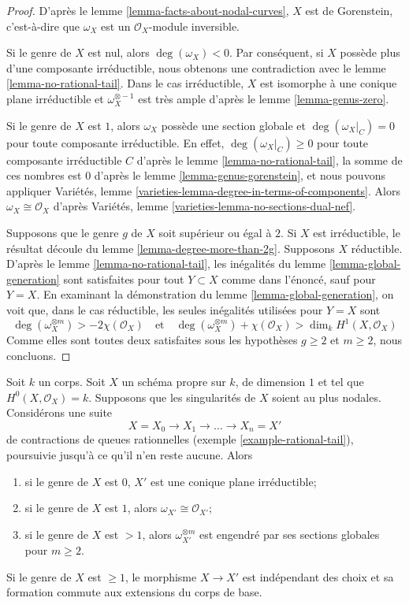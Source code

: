 \begin{proof}
D'après le lemme \ref{lemma-facts-about-nodal-curves}, $X$ est de Gorenstein, c'est-à-dire que $\omega_X$ est un $\mathcal{O}_X$-module inversible.

\medskip\noindent
Si le genre de $X$ est nul, alors $\deg(\omega_X) < 0$. Par conséquent, si $X$ possède plus d'une composante irréductible, nous obtenons une contradiction avec le lemme \ref{lemma-no-rational-tail}. Dans le cas irréductible, $X$ est isomorphe à une conique plane irréductible et $\omega_X^{\otimes -1}$ est très ample d'après le lemme \ref{lemma-genus-zero}.

\medskip\noindent
Si le genre de $X$ est $1$, alors $\omega_X$ possède une section globale et $\deg(\omega_X|_C) = 0$ pour toute composante irréductible. En effet, $\deg(\omega_X|_C) \geq 0$ pour toute composante irréductible $C$ d'après le lemme \ref{lemma-no-rational-tail}, la somme de ces nombres est $0$ d'après le lemme \ref{lemma-genus-gorenstein}, et nous pouvons appliquer Variétés, lemme \ref{varieties-lemma-degree-in-terms-of-components}. Alors $\omega_X \cong \mathcal{O}_X$ d'après Variétés, lemme \ref{varieties-lemma-no-sections-dual-nef}.

\medskip\noindent
Supposons que le genre $g$ de $X$ soit supérieur ou égal à $2$. Si $X$ est irréductible, le résultat découle du lemme \ref{lemma-degree-more-than-2g}. Supposons $X$ réductible. D'après le lemme \ref{lemma-no-rational-tail}, les inégalités du lemme \ref{lemma-global-generation} sont satisfaites pour tout $Y \subset X$ comme dans l'énoncé, sauf pour $Y = X$. En examinant la démonstration du lemme \ref{lemma-global-generation}, on voit que, dans le cas réductible, les seules inégalités utilisées pour $Y = X$ sont $$
\deg(\omega_X^{\otimes m}) > -2 \chi(\mathcal{O}_X)
\quad\text{et}\quad
\deg(\omega_X^{\otimes m}) + \chi(\mathcal{O}_X) > \dim_k H^1(X, \mathcal{O}_X)
$$ Comme elles sont toutes deux satisfaites sous les hypothèses $g \geq 2$ et $m \geq 2$, nous concluons.
\end{proof}

\begin{lemma}
\label{lemma-contracting-rational-tails}
Soit $k$ un corps. Soit $X$ un schéma propre sur $k$, de dimension $1$ et tel que $H^0(X, \mathcal{O}_X) = k$. Supposons que les singularités de $X$ soient au plus nodales. Considérons une suite $$
X = X_0 \to X_1 \to \ldots \to X_n = X'
$$ de contractions de queues rationnelles (exemple \ref{example-rational-tail}), poursuivie jusqu'à ce qu'il n'en reste aucune. Alors \begin{enumerate} \item si le genre de $X$ est $0$, $X'$ est une conique plane irréductible; \item si le genre de $X$ est $1$, alors $\omega_{X'} \cong \mathcal{O}_{X'}$; \item si le genre de $X$ est $> 1$, alors $\omega_{X'}^{\otimes m}$ est engendré par ses sections globales pour $m \geq 2$. \end{enumerate} Si le genre de $X$ est $\geq 1$, le morphisme $X \to X'$ est indépendant des choix et sa formation commute aux extensions du corps de base.
\end{lemma}

